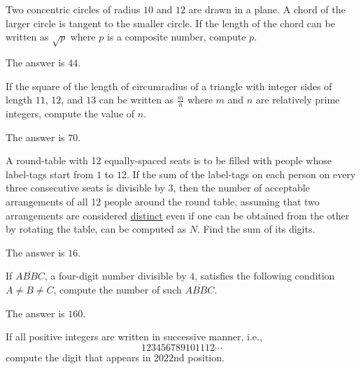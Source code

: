 \begin{problem}
Two concentric circles of radius $10$ and $12$ are drawn in a plane. A chord of the larger circle is tangent to the smaller circle. If the length of the chord can be written as $\sqrt{p}$ where $p$ is a composite number, compute $p$.
\end{problem}

\begin{solution}
The answer is $44$.
\end{solution}

\begin{problem}
If the square of the length of circumradius of a triangle with integer sides of length $11$, $12$, and $13$ can be written as $\frac{m}{n}$ where $m$ and $n$ are relatively prime integers, compute the value of $n$.
\end{problem}

\begin{solution}
The answer is $70$.
\end{solution}

\begin{problem}
A round-table with 12 equally-spaced seats is to be filled with people whose label-tags start from $1$ to $12$. If the sum of the label-tags on each person on every three consecutive seats is divisible by $3$, then the number of acceptable arrangements of all 12 people around the round table, assuming that two arrangements are considered \underline{distinct} even if one can be obtained from the other by rotating the table, can be computed as $N$. Find the sum of its digits.
\end{problem}

\begin{solution}
The answer is $16$.
\end{solution}

\begin{problem}
If $\overline{ABBC}$, a four-digit number divisible by $4$, satisfies the following condition $A\neq B \neq C$, compute the number of such $\overline{ABBC}$.
\end{problem}

\begin{solution}
The answer is $160$.
\end{solution}

\begin{problem}
If all positive integers are written in successive manner, i.e., \[123456789101112\cdots\] compute the digit that appears in $2022$nd position.
\end{problem}

